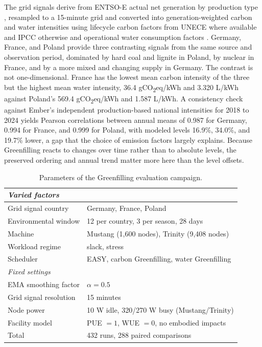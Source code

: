 The grid signals derive from ENTSO-E actual net generation by production type \parencite{hirth2018ENTSOE}, resampled to a 15-minute grid and converted into generation-weighted carbon and water intensities using lifecycle carbon factors from UNECE where available and IPCC otherwise \parencite{unitednations2022Carbon, intergovernmentalpanelonclimatechange2015Climate} and operational water consumption factors \parencite{macknick2012Operational}. Germany, France, and Poland provide three contrasting signals from the same source and observation period, dominated by hard coal and lignite in Poland, by nuclear in France, and by a more mixed and changing supply in Germany. The contrast is not one-dimensional. France has the lowest mean carbon intensity of the three but the highest mean water intensity, 36.4 gCO\textsubscript{2}eq/kWh and 3.320 L/kWh against Poland's 569.4 gCO\textsubscript{2}eq/kWh and 1.587 L/kWh. A consistency check against Ember's independent production-based national intensities for 2018 to 2024 yields Pearson correlations between annual means of 0.987 for Germany, 0.994 for France, and 0.999 for Poland, with modeled levels 16.9\%, 34.0\%, and 19.7\% lower, a gap that the choice of emission factors largely explains. Because Greenfilling reacts to changes over time rather than to absolute levels, the preserved ordering and annual trend matter more here than the level offsets.

\begin{table}
\centering
\caption{Parameters of the Greenfilling evaluation campaign.}
\label{tab:greenfilling-campaign}
\begin{tabular}{ll}
\toprule
\multicolumn{2}{l}{\emph{Varied factors}} \\
\midrule
Grid signal country & Germany, France, Poland \\
Environmental window & 12 per country, 3 per season, 28 days \\
Machine & Mustang (1,600 nodes), Trinity (9,408 nodes) \\
Workload regime & slack, stress \\
Scheduler & EASY, carbon Greenfilling, water Greenfilling \\
\midrule
\multicolumn{2}{l}{\emph{Fixed settings}} \\
\midrule
EMA smoothing factor & $\alpha = 0.5$ \\
Grid signal resolution & 15 minutes \\
Node power & 10 W idle, 320/270 W busy (Mustang/Trinity) \\
Facility model & PUE $=1$, WUE $=0$, no embodied impacts \\
\midrule
Total & 432 runs, 288 paired comparisons \\
\bottomrule
\end{tabular}
\end{table}

